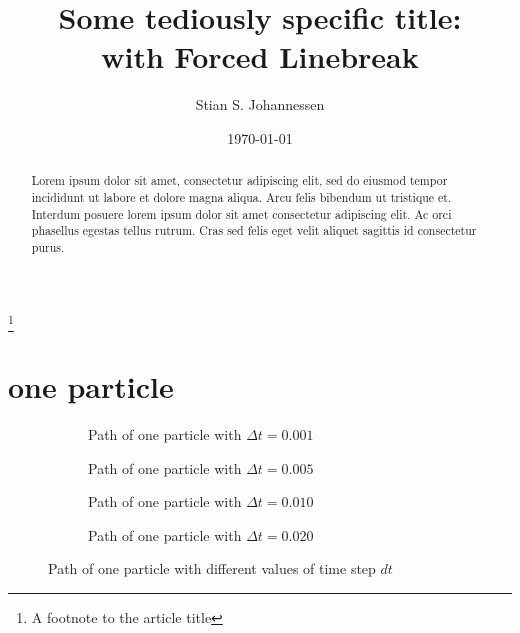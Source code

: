 \documentclass[10pt,a4paper,apm,twocolumn,secnumarabic,numerical,balancelastpage,nofootinbib,superscriptaddress]{revtex4-2}
\begin{document}

\title{Some tediously specific title:\\with Forced Linebreak}%
\thanks{A footnote to the article title}%

\author{Stian S. Johannessen}
\date{\today}

\begin{abstract}
	Lorem ipsum dolor sit amet, consectetur adipiscing elit, sed do eiusmod tempor incididunt ut labore et dolore magna aliqua. Arcu felis bibendum ut tristique et. Interdum posuere lorem ipsum dolor sit amet consectetur adipiscing elit. Ac orci phasellus egestas tellus rutrum. Cras sed felis eget velit aliquet sagittis id consectetur purus.
\end{abstract}

\maketitle

	\section{one particle}
	
	\begin{figure*}[htb]
		\centering
		\begin{subfigure}{.45\textwidth}
			\scalebox{0.6}{}
			\caption{Path of one particle with $\Delta t=0.001$}
		\end{subfigure}
		\begin{subfigure}{.45\textwidth}
			\scalebox{0.6}{}
			\caption{Path of one particle with $\Delta t=0.005$}
		\end{subfigure}
		\begin{subfigure}{.45\textwidth}
			\scalebox{0.6}{}
			\caption{Path of one particle with $\Delta t=0.010$}
		\end{subfigure}
		\begin{subfigure}{.45\textwidth}
			\scalebox{0.6}{}
			\caption{Path of one particle with $\Delta t=0.020$}
		\end{subfigure}
		\caption{Path of one particle with different values of time step $dt$}
	\end{figure*}
	
\end{document}

